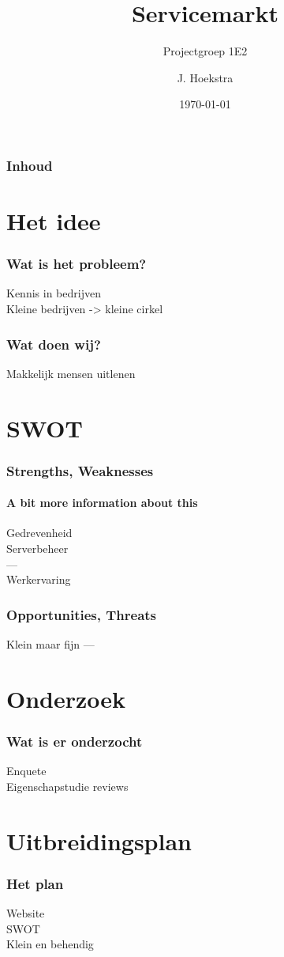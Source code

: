\documentclass[luatex,aspectratio=169,mathserif,serif]{beamer}
\title{Servicemarkt}
\subtitle{Projectgroep 1E2}
\author{J. Hoekstra}
\institute{NHL Stenden Hogeschool}
\date{\today}
\begin{document}
  \frame{\titlepage}
  \begin{frame}
	  \frametitle{Inhoud}
	  \tableofcontents
  \end{frame}
  \section{Het idee}
	\begin{frame}
		\frametitle{Wat is het probleem?}
		Kennis in bedrijven \\
		Kleine bedrijven -> kleine cirkel
		
	\end{frame}

	\begin{frame}
		\frametitle{Wat doen wij?}
		Makkelijk mensen uitlenen \\

	\end{frame}
  \section{SWOT}
  	\begin{frame}
    		\frametitle{Strengths, Weaknesses}
    		\framesubtitle{A bit more information about this}
		Gedrevenheid \\
		Serverbeheer \\
		--- \\
		Werkervaring \\
  	\end{frame}
  	\begin{frame}
		\frametitle{Opportunities, Threats}
		Klein maar fijn
		---
		
	\end{frame}
  \section{Onderzoek}
  	\begin{frame}
		\frametitle{Wat is er onderzocht}
		Enquete \\
		Eigenschapstudie reviews
  	\end{frame}

  \section{Uitbreidingsplan}
	\begin{frame}
		\frametitle{Het plan}
		
		Website \\
		SWOT \\
		Klein en behendig
	\end{frame}
\end{document}
